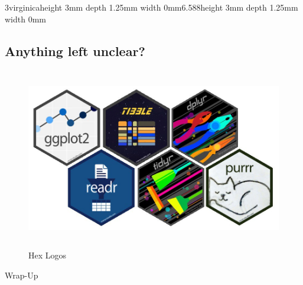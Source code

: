 \documentclass[
]{book}
\begin{document}
{3\hspace*{0.52em}\hspace*{0.52em}\textcolor[HTML]{000000}{\colorbox[HTML]{FF69B4}{\hspace*{0.52em}\hspace*{0.52em}virginica\vrule height 3mm depth 1.25mm width 0mm}}\textcolor[HTML]{000000}{\colorbox[HTML]{FF69B4}{\hspace*{0.52em}\hspace*{0.52em}\hspace*{0.52em}\hspace*{0.52em}\hspace*{0.52em}\hspace*{0.52em}\hspace*{0.52em}\hspace*{0.52em}\hspace*{0.52em}\hspace*{0.52em}\hspace*{0.52em}\hspace*{0.52em}\hspace*{0.52em}6.588\vrule height 3mm depth 1.25mm width 0mm}}\\

}
\endgroup

\subsection{Anything left unclear?}\label{anything-left-unclear}

\begin{figure}
\centering
\includegraphics[width=\textwidth,height=3.125in]{./img/hexagons.png}
\caption{Hex Logos}
\end{figure}

Wrap-Up
\end{document}
